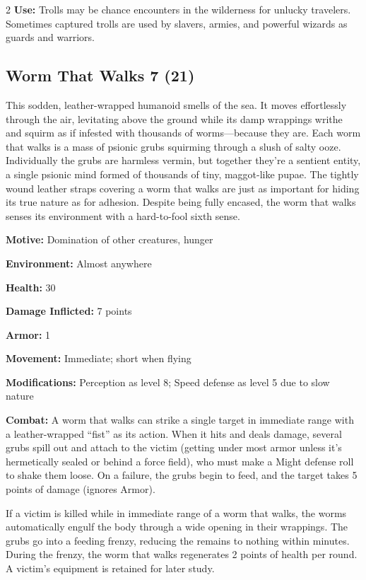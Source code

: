 \begin{multicols}{2}
\textbf{Use:} Trolls may be chance encounters in the wilderness for unlucky travelers. Sometimes captured trolls are used by slavers, armies, and powerful wizards as guards and warriors.

\subsection{Worm That Walks 7 (21)}

This sodden, leather-wrapped humanoid smells of the sea. It moves effortlessly through the air, levitating above the ground while its damp wrappings writhe and squirm as if infested with thousands of worms—because they are. Each worm that walks is a mass of psionic grubs squirming through a slush of salty ooze. Individually the grubs are harmless vermin, but together they’re a sentient entity, a single psionic mind formed of thousands of tiny, maggot-like pupae. The tightly wound leather straps covering a worm that walks are just as important for hiding its true nature as for adhesion. Despite being fully encased, the worm that walks senses its environment with a hard-to-fool sixth sense. 

\textbf{Motive:} Domination of other creatures, hunger 

\textbf{Environment:} Almost anywhere 

\textbf{Health:} 30 

\textbf{Damage Inflicted:} 7 points

\textbf{Armor:} 1 

\textbf{Movement:} Immediate; short when flying 

\textbf{Modifications:} Perception as level 8; Speed defense as level 5 due to slow nature 

\textbf{Combat:} A worm that walks can strike a single target in immediate range with a leather-wrapped “fist” as its action. When it hits and deals damage, several grubs spill out and attach to the victim (getting under most armor unless it’s hermetically sealed or behind a force field), who must make a Might defense roll to shake them loose. On a failure, the grubs begin to feed, and the target takes 5 points of damage (ignores Armor).

If a victim is killed while in immediate range of a worm that walks, the worms automatically engulf the body through a wide opening in their wrappings. The grubs go into a feeding frenzy, reducing the remains to nothing within minutes. During the frenzy, the worm that walks regenerates 2 points of health per round. A victim’s equipment is retained for later study. 


\end{multicols}
